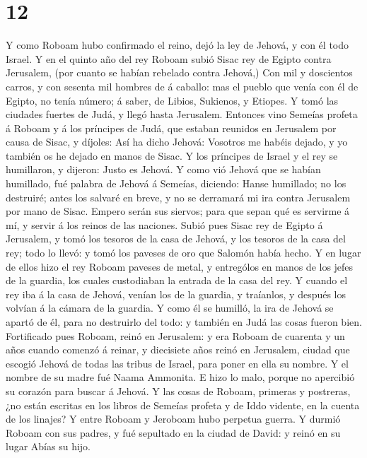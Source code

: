 \hypertarget{section-11}{%
\section{12}\label{section-11}}

 Y como Roboam hubo confirmado el reino, dejó la ley de
Jehová, y con él todo Israel.  Y en el quinto año del rey
Roboam subió Sisac rey de Egipto contra Jerusalem, (por cuanto se habían
rebelado contra Jehová,)  Con mil y doscientos carros, y con
sesenta mil hombres de á caballo: mas el pueblo que venía con él de
Egipto, no tenía número; á saber, de Libios, Sukienos, y Etiopes.
 Y tomó las ciudades fuertes de Judá, y llegó hasta
Jerusalem.  Entonces vino Semeías profeta á Roboam y á los
príncipes de Judá, que estaban reunidos en Jerusalem por causa de Sisac,
y díjoles: Así ha dicho Jehová: Vosotros me habéis dejado, y yo también
os he dejado en manos de Sisac.  Y los príncipes de Israel y
el rey se humillaron, y dijeron: Justo es Jehová.  Y como
vió Jehová que se habían humillado, fué palabra de Jehová á Semeías,
diciendo: Hanse humillado; no los destruiré; antes los salvaré en breve,
y no se derramará mi ira contra Jerusalem por mano de Sisac.
 Empero serán sus siervos; para que sepan qué es servirme á
mí, y servir á los reinos de las naciones.  Subió pues Sisac
rey de Egipto á Jerusalem, y tomó los tesoros de la casa de Jehová, y
los tesoros de la casa del rey; todo lo llevó: y tomó los paveses de oro
que Salomón había hecho.  Y en lugar de ellos hizo el rey
Roboam paveses de metal, y entrególos en manos de los jefes de la
guardia, los cuales custodiaban la entrada de la casa del rey.
 Y cuando el rey iba á la casa de Jehová, venían los de la
guardia, y traíanlos, y después los volvían á la cámara de la guardia.
 Y como él se humilló, la ira de Jehová se apartó de él,
para no destruirlo del todo: y también en Judá las cosas fueron bien.
 Fortificado pues Roboam, reinó en Jerusalem: y era Roboam
de cuarenta y un años cuando comenzó á reinar, y diecisiete años reinó
en Jerusalem, ciudad que escogió Jehová de todas las tribus de Israel,
para poner en ella su nombre. Y el nombre de su madre fué Naama
Ammonita.  E hizo lo malo, porque no apercibió su corazón
para buscar á Jehová.  Y las cosas de Roboam, primeras y
postreras, ¿no están escritas en los libros de Semeías profeta y de Iddo
vidente, en la cuenta de los linajes? Y entre Roboam y Jeroboam hubo
perpetua guerra.  Y durmió Roboam con sus padres, y fué
sepultado en la ciudad de David: y reinó en su lugar Abías su hijo.

